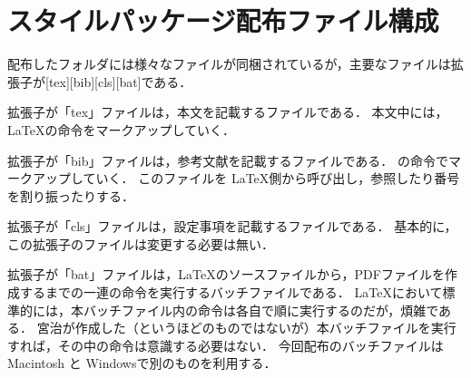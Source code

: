 \section{スタイルパッケージ配布ファイル構成}
配布したフォルダには様々なファイルが同梱されているが，主要なファイルは拡張子が[tex][bib][cls][bat]である．

拡張子が「tex」ファイルは，本文を記載するファイルである．
本文中には，\LaTeX の命令をマークアップしていく．

拡張子が「bib」ファイルは，参考文献を記載するファイルである．
\BibTeX の命令でマークアップしていく．
このファイルを \LaTeX 側から呼び出し，参照したり番号を割り振ったりする．

拡張子が「cls」ファイルは，設定事項を記載するファイルである．
基本的に，この拡張子のファイルは変更する必要は無い．

拡張子が「bat」ファイルは，\LaTeX のソースファイルから，PDFファイルを作成するまでの一連の命令を実行するバッチファイルである．
\LaTeX において標準的には，本バッチファイル内の命令は各自で順に実行するのだが，煩雑である．
宮治が作成した（というほどのものではないが）本バッチファイルを実行すれば，その中の命令は意識する必要はない．
今回配布のバッチファイルは Macintosh と Windowsで別のものを利用する．


